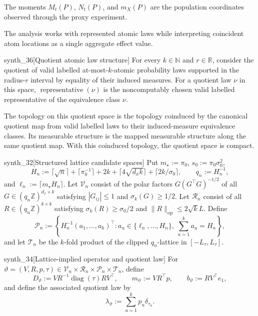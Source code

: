 \documentclass[11pt]{article}
\begin{document}
The moments \(M_t(P)\), \(N_t(P)\), and \(m_X(P)\) are the population coordinates observed through the proxy experiment.

The analysis works with represented atomic laws while interpreting coincident atom locations as a single aggregate effect value.

\begin{definitionv}{synth_36}[Quotient atomic law structure]
For every \(k\in\mathbb N\) and \(r\in\mathbb R\), consider the quotient of valid labelled at-most-\(k\)-atomic probability laws supported in the radius-\(r\) interval by equality of their induced measures.  For a quotient law \(\nu\) in this space, \(\operatorname{representative}(\nu)\) is the noncomputably chosen valid labelled representative of the equivalence class \(\nu\).

The topology on this quotient space is the topology coinduced by the canonical quotient map from valid labelled laws to their induced-measure equivalence classes.  Its measurable structure is the mapped measurable structure along the same quotient map.  With this coinduced topology, the quotient space is compact.
\end{definitionv}

\begin{definitionv}{synth_32}[Structured lattice candidate spaces]
Put \(m_\star:=\pi_0\), \(s_0:=\pi_0\sigma_0^2\), \[H_n:=\lceil\sqrt n\rceil+\lceil\pi_0^{-1}\rceil+2k+\lceil4\sqrt{d_xk}\rceil+\lceil2k/\sigma_0\rceil,\qquad q_n:=H_n^{-1},\] and \(\ell_n:=\lceil m_\star H_n\rceil\). Let \(\mathcal V_n\) consist of the polar factors \(G(G^\top G)^{-1/2}\) of all \(G\in(q_n\mathbb Z)^{d_x\times k}\) satisfying \(|G_{ij}|\le1\) and \(\sigma_k(G)\ge1/2\). Let \(\mathcal R_n\) consist of all \(R\in(q_n\mathbb Z)^{k\times k}\) satisfying \(\sigma_k(R)\ge\sigma_0/2\) and \(\lVert R\rVert_{\mathrm{op}}\le2\sqrt{k}L\). Define \[\mathcal P_n:=\left\{H_n^{-1}(a_1,\ldots,a_k)^\top:a_u\in\{\ell_n,\ldots,H_n\},\ \sum_{u=1}^k a_u=H_n\right\},\] and let \(\mathcal T_n\) be the \(k\)-fold product of the clipped \(q_n\)-lattice in \([-L_\tau,L_\tau]\).
\end{definitionv}

\begin{definitionv}{synth_34}[Lattice-implied operator and quotient law]
For \(\vartheta=(V,R,p,\tau)\in\mathcal V_n\times\mathcal R_n\times\mathcal P_n\times\mathcal T_n\), define \[D_\vartheta:=VR^{-1}\operatorname{diag}(\tau)RV^\top,\qquad m_\vartheta:=VR^\top p,\qquad b_\vartheta:=RV^\top e_1,\] and define the associated quotient law by \[\lambda_\vartheta:=\sum_{u=1}^k p_u\delta_{\tau_u}.\]
\end{definitionv}
\end{document}
